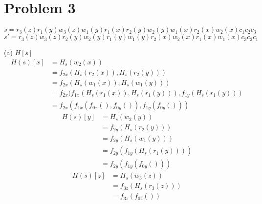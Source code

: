 \documentclass[12pt]{article}
\begin{document}
\section*{Problem 3}
\begin{equation*}
    s = r_3(z) r_1(y) w_3(z) w_1(y) r_1(x) r_2(y) w_2(y) w_1(x) r_2(x) w_2(x) c_1 c_2 c_3
\end{equation*}
\begin{equation*}
    s' = r_3(z) w_3(z) r_2(y) w_2(y) r_1(y) w_1(y) r_2(x) w_2(x) r_1(x) w_1(x) c_3 c_2 c_1
\end{equation*}

(a) $H[s]$
\begin{equation*}
    \begin{split}
        H(s)[x] &= H_s(w_2(x)) \\
        &= f_{2x}(H_s(r_2(x)), H_s(r_2(y))) \\
        &= f_{2x}(H_s(w_1(x)), H_s(w_1(y))) \\
        &= f_{2x}(f_{1x}(H_s(r_1(x)), H_s(r_1(y))), f_{1y}(H_s(r_1(y))) \\
        &= f_{2x}(f_{1x}(f_{0x}(), f_{0y}()), f_{1y}(f_{0y}()))
    \end{split}
\end{equation*}
\begin{equation*}
    \begin{split}
        H(s)[y] &= H_s(w_2(y)) \\
        &= f_{2y}(H_s(r_2(y))) \\
        &= f_{2y}(H_s(w_1(y))) \\
        &= f_{2y}(f_{1y}(H_s(r_1(y)))) \\
        &= f_{2y}(f_{1y}(f_{0y}()))
    \end{split}
\end{equation*}
\begin{equation*}
    \begin{split}
        H(s)[z] &= H_s(w_3(z)) \\
        &= f_{3z}(H_s(r_3(z))) \\
        &= f_{3z}(f_{0z}())
    \end{split}
\end{equation*}
\end{document}
